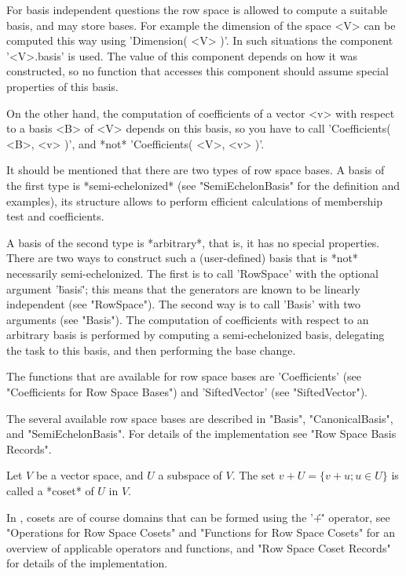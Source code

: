 For basis independent questions the row space is allowed to compute a
suitable basis, and may store bases.  For example the dimension of the space
<V> can be computed this way using 'Dimension( <V> )'.
In such situations the component '<V>.basis' is used.  The value of this
component depends on how it was constructed, so no function that accesses
this component should assume special properties of this basis.

On the other hand, the computation of coefficients of a vector <v> with
respect to a basis <B> of <V> depends on this basis, so you have to call
'Coefficients( <B>, <v> )', and *not* 'Coefficients( <V>, <v> )'.

It should be mentioned that there are two types of row space bases.
A basis of the first type is *semi-echelonized* (see "SemiEchelonBasis"
for the definition and examples), its structure allows to perform
efficient calculations of membership test and coefficients.

A basis of the second type is *arbitrary*, that is, it has no special
properties.  There are two ways to construct such a (user-defined) basis
that is *not* necessarily semi-echelonized.  The first is to call
'RowSpace' with the optional argument '\"basis\"'; this means that the
generators are known to be linearly independent (see "RowSpace").
The second way is to call 'Basis' with two arguments (see "Basis").
The computation of coefficients with respect to an arbitrary basis is
performed by computing a semi-echelonized basis, delegating the task to
this basis, and then performing the base change.

The functions that are available for row space bases are 'Coefficients'
(see "Coefficients for Row Space Bases") and 'SiftedVector' (see
"SiftedVector").

The several available row space bases are described in "Basis",
"CanonicalBasis", and "SemiEchelonBasis".
For details of the implementation see "Row Space Basis Records".


Let $V$ be a vector space, and $U$ a subspace of $V$.
The set $v + U = \{ v + u; u \in U\}$ is called a *coset* of $U$ in $V$.

In {\GAP}, cosets are of course domains that can be formed using the
'\'+\'' operator, see "Operations for Row Space Cosets" and "Functions
for Row Space Cosets" for an overview of applicable operators and
functions, and "Row Space Coset Records" for details of the
implementation.

